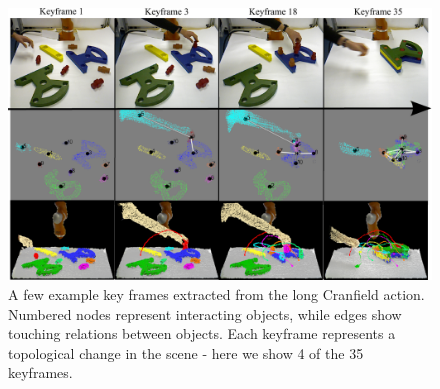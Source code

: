 \begin{figure}[ht!]
  \centering
  \includegraphics[width=\linewidth]{figures/IROS2013/SECKF.pdf}
  \caption[Cranfield Key Frames]{A few example key frames extracted from the long Cranfield action. Numbered nodes represent interacting objects, while edges show touching relations between objects. Each keyframe represents a topological change in the scene - here we show 4 of the 35 keyframes.}
  \label{fig:SECGraphs}
\end{figure}